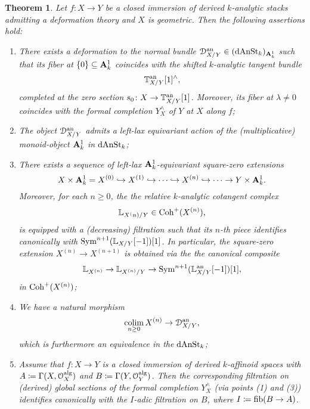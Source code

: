 \documentclass[10pt,a4paper,reqno]{amsart} %
\theoremstyle{plain}
\newtheorem{thm}{Theorem}[section]
\theoremstyle{definition}
\theoremstyle{remark}
\numberwithin{equation}{section}
\begin{document}
\begin{thm}
    Let $f \colon X \to Y$ be a closed immersion of derived $k$-analytic stacks admitting a deformation theory and $X$ is geometric. Then the following assertions hold:
    \begin{enumerate}
        \item There exists a deformation to the normal bundle $\mathcal D_{X/ Y}^\mathrm{an} \in (\mathrm{dAnSt}_k)_{\mathbf A^1_k}$ such that its fiber at $\{0 \} \subseteq \mathbf A^1_k$
        coincides with the shifted $k$-analytic tangent bundle
            \[
                \mathbb T_{X/Y}^\mathrm{an}[1]^\wedge  ,
            \]
        completed at the zero section $s_0 \colon X \to \mathbb T^\mathrm{an}_{X/ Y}[1]$. Moreover, its fiber at $\lambda \neq 0$ coincides with the formal completion $Y^\wedge_X$ of $Y$ at $X$ along $f$;
        \item The object $\mathcal D_{X/ Y}^\mathrm{an}$ admits a left-lax equivariant action of the (multiplicative) monoid-object $\mathbf A^1_k$ in $\mathrm{dAnSt}_k$;
        \item There exists a sequence of left-lax $\mathbf A^1_k$-equivariant square-zero extensions
            \[
                X \times \mathbf A^1_k = X^{(0)} \hookrightarrow X^{(1)} \hookrightarrow \dots \hookrightarrow X^{(n)} \hookrightarrow \dots \to Y \times \mathbf A^1_k.
            \]
        Moreover, for each $n \ge 0$, the the relative $k$-analytic cotangent complex
            \[
                \mathbb L_{X^(n)/ Y} \in \mathrm{Coh}^+(X^{(n)}),  
            \]
        is equipped with a (decreasing) filtration such that its $n$-th piece identifies canonically with $\operatorname{Sym}^{n+1}(\mathbb L_{X/ Y}[-1])[1]$.
        In particular, the square-zero extension
        $X^{(n)} \to X^{(n+1)}$ is obtained via the the canonical composite
            \[
                \mathbb L_{X^{(n)}} \to \mathbb L_{X^{(n)}/ Y} \to   \operatorname{Sym}^{n+1}(\mathbb L_{X/ Y}^\mathrm{an}[-1])[1],
            \]
        in $\mathrm{Coh}^+(X^{(n)})$;
        \item We have a natural morphism
            \[
                \operatorname*{colim}_{n \ge 0} X^{(n)} \to \mathcal D_{X/ Y}^\mathrm{an},   
            \]
        which is furthermore an equivalence in the \infcat $\mathrm{dAnSt}_k$;
        \item Assume that $f \colon X \to Y$ is a closed immersion of derived $k$-affinoid spaces with $A \coloneqq \Gamma(X, \mathcal O_X^\mathrm{alg})$
        and $B \coloneqq \Gamma(Y, \mathcal O_Y^\mathrm{alg})$. Then the corresponding filtration on (derived)
        global sections of the formal completion $Y^\wedge_X$ (via points (1) and (3)) identifies canonically with the $I$-adic filtration on
        $B$, where $I \coloneqq \mathrm{fib}(B \to A)$.
    \end{enumerate}
\end{thm}
\end{document}
